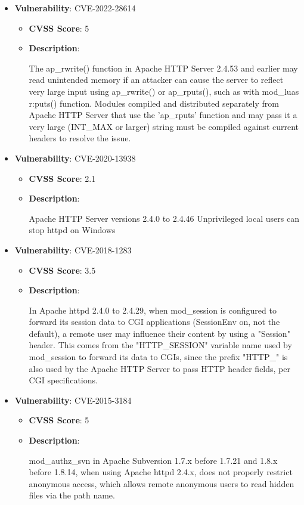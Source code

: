 \documentclass{article}
\begin{document}
\begin{itemize}
        \item \textbf{Vulnerability}: CVE-2022-28614
        \begin{itemize}
            \item \textbf{CVSS Score}:  5 
            \item \textbf{Description}:
            \parbox[t]{0.9\linewidth}{
                \ttfamily The ap\_rwrite() function in Apache HTTP Server 2.4.53 and earlier may read unintended memory if an attacker can cause the server to reflect very large input using ap\_rwrite() or ap\_rputs(), such as with mod\_luas r:puts() function. Modules compiled and distributed separately from Apache HTTP Server that use the 'ap\_rputs' function and may pass it a very large (INT\_MAX or larger) string must be compiled against current headers to resolve the issue.
            }
        \end{itemize}
    
        \item \textbf{Vulnerability}: CVE-2020-13938
        \begin{itemize}
            \item \textbf{CVSS Score}:  2.1 
            \item \textbf{Description}:
            \parbox[t]{0.9\linewidth}{
                \ttfamily Apache HTTP Server versions 2.4.0 to 2.4.46 Unprivileged local users can stop httpd on Windows
            }
        \end{itemize}
    
        \item \textbf{Vulnerability}: CVE-2018-1283
        \begin{itemize}
            \item \textbf{CVSS Score}:  3.5 
            \item \textbf{Description}:
            \parbox[t]{0.9\linewidth}{
                \ttfamily In Apache httpd 2.4.0 to 2.4.29, when mod\_session is configured to forward its session data to CGI applications (SessionEnv on, not the default), a remote user may influence their content by using a "Session" header. This comes from the "HTTP\_SESSION" variable name used by mod\_session to forward its data to CGIs, since the prefix "HTTP\_" is also used by the Apache HTTP Server to pass HTTP header fields, per CGI specifications.
            }
        \end{itemize}
    
        \item \textbf{Vulnerability}: CVE-2015-3184
        \begin{itemize}
            \item \textbf{CVSS Score}:  5 
            \item \textbf{Description}:
            \parbox[t]{0.9\linewidth}{
                \ttfamily mod\_authz\_svn in Apache Subversion 1.7.x before 1.7.21 and 1.8.x before 1.8.14, when using Apache httpd 2.4.x, does not properly restrict anonymous access, which allows remote anonymous users to read hidden files via the path name.
            }
        \end{itemize}
    

\end{itemize}
\end{document}
